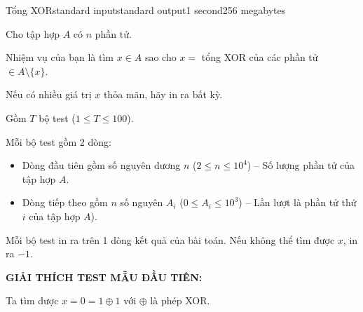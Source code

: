 \begin{problem}{Tổng XOR}{standard input}{standard output}{1 second}{256 megabytes}

Cho tập hợp $A$ có $n$ phần tử.

Nhiệm vụ của bạn là tìm $x \in A$ sao cho $x =$ tổng XOR của các phần tử $\in A \setminus \{x\}$.

Nếu có nhiều giá trị $x$ thỏa mãn, hãy in ra bất kỳ.

\InputFile
Gồm $T$ bộ test ($1 \le T \le 100$).

Mỗi bộ test gồm 2 dòng:

\begin{itemize}
  \item Dòng đầu tiên gồm số nguyên dương $n$ ($2 \le n \le 10^4$) -- Số lượng phần tử của tập hợp $A$.
  \item Dòng tiếp theo gồm $n$ số nguyên $A_i$ ($0 \le A_i \le 10^3$) -- Lần lượt là phần tử thứ $i$ của tập hợp $A$).
\end{itemize}

\OutputFile
Mỗi bộ test in ra trên 1 dòng kết quả của bài toán. Nếu không thể tìm được $x$, in ra $-1$.

\Example

\begin{example}
%
\end{example}

\Note
\bf{GIẢI THÍCH TEST MẪU ĐẦU TIÊN:}

Ta tìm được $x = 0 = 1 \oplus 1$ với $\oplus$ là phép XOR.

\end{problem}

